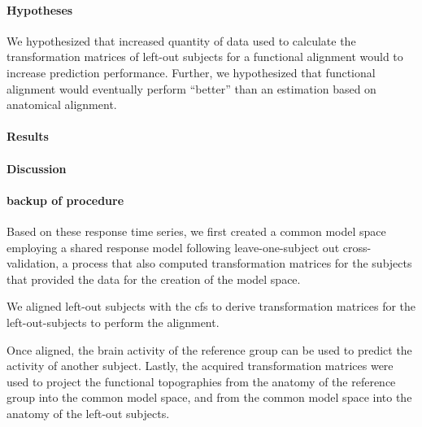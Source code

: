 \paragraph{Hypotheses}

%
We hypothesized that increased quantity of data used to calculate the
transformation matrices of left-out subjects for a functional alignment would to
increase prediction performance.
%
Further, we hypothesized that functional alignment would eventually perform
``better'' than an estimation based on anatomical alignment.


\paragraph{Results}



\paragraph{Discussion}



\paragraph{backup of procedure}


Based on these response time series, we first created a common model space
employing a shared response model \citep{chen2015reduced} following
leave-one-subject out cross-validation, a process that also computed
transformation matrices for the subjects that provided the data for the creation
of the model space.

We aligned left-out subjects with the \ac{cfs} to derive
transformation matrices for the left-out-subjects to perform the alignment.

%
Once aligned, the brain activity of the reference group can be used to predict
the activity of another subject.
Lastly, the acquired transformation matrices were used to project the functional
topographies from the anatomy of the reference group into the common model
space, and from the common model space into the anatomy of the left-out
subjects.
